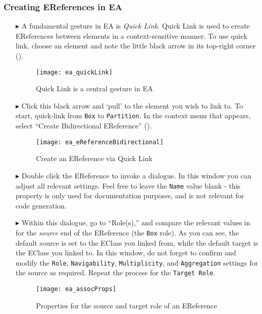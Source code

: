 \newpage
\subsubsection{Creating EReferences in EA}
\genHeader
\hypertarget{static:references vis}{}

\begin{itemize}

\item[$\blacktriangleright$] A fundamental gesture in EA is \emph{Quick Link}. Quick Link is used to create EReferences between elements in a context-sensitive
manner. To use quick link, choose an element and note the little black arrow in its top-right corner ().

\begin{figure}[htbp]
	\centering
  \texttt{[image: ea\_quickLink]}
	\caption{Quick Link is a central gesture in EA}
	\label{ea:quicklink}
\end{figure}
\FloatBarrier

\item[$\blacktriangleright$] Click this black arrow and `pull' to the element you wish to link to. To start, quick-link from \texttt{Box} to \texttt{Partition}.
In the context menu that appears, select ``Create Bidirectional EReference'' ().

\begin{figure}[htbp]
	\centering
  \texttt{[image: ea\_eReferenceBidirectional]}
	\caption{Create an EReference via Quick Link}
	\label{ea:ereference}
\end{figure}
\FloatBarrier

\item[$\blacktriangleright$] Double click the EReference to invoke a dialogue. In this window you can adjust all relevant settings. Feel free to leave the
\texttt{Name} value blank - this property is only used for documentation purposes, and is not relevant for code generation.

\item[$\blacktriangleright$] Within this dialogue, go to ``Role(s),'' and compare the relevant values in  for the \emph{source} 
end of the EReference (the \texttt{Box} role). As you can see, the default source is set to the EClass you linked from, while the default target
is the EClass you linked to. In this window, do not forget to confirm and modify the \texttt{Role}, \texttt{Navigability}, \texttt{Multiplicity}, and
\texttt{Aggregation} settings for the source as required. Repeat the process for the \texttt{Target Role}.

\vspace{0.5cm}

\begin{figure}[htbp]
	\centering
    \texttt{[image: ea\_assocProps]}
	\caption{Properties for the source and target role of an EReference}
	\label{ea:roles}
\end{figure}

\end{itemize}

